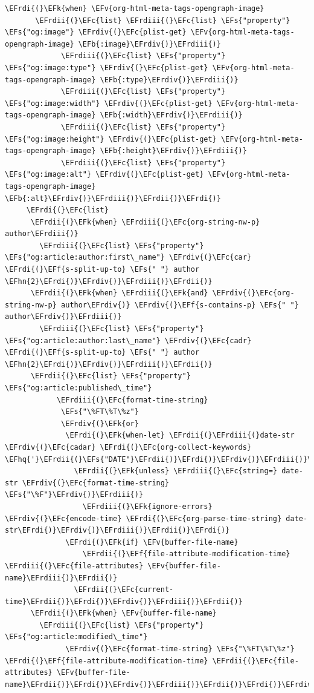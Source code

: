 \documentclass{scrartcl}
\newcommand{\EFk}[1]{\textcolor{EFk}{#1}} %
\newcommand{\EFs}[1]{\textcolor{EFs}{#1}} %
\newcommand{\EFb}[1]{\textcolor{EFb}{#1}} %
\newcommand{\EFc}[1]{\textcolor{EFc}{#1}} %
\newcommand{\EFv}[1]{\textcolor{EFv}{#1}} %
\newcommand{\EFf}[1]{\textcolor{EFf}{#1}} %
\newcommand{\EFhn}[1]{\textcolor{EFhn}{\textbf{#1}}} %
\newcommand{\EFhq}[1]{\textcolor{EFhq}{#1}} %
\newcommand{\EFrdi}[1]{\textcolor{EFrdi}{#1}} %
\newcommand{\EFrdii}[1]{\textcolor{EFrdii}{#1}} %
\newcommand{\EFrdiii}[1]{\textcolor{EFrdiii}{#1}} %
\newcommand{\EFrdiv}[1]{\textcolor{EFrdiv}{#1}} %
\begin{document}
\begin{Code}
\begin{Verbatim}[]
     \EFrdi{(}\EFk{when} \EFv{org-html-meta-tags-opengraph-image}
       \EFrdii{(}\EFc{list} \EFrdiii{(}\EFc{list} \EFs{"property"} \EFs{"og:image"} \EFrdiv{(}\EFc{plist-get} \EFv{org-html-meta-tags-opengraph-image} \EFb{:image}\EFrdiv{)}\EFrdiii{)}
             \EFrdiii{(}\EFc{list} \EFs{"property"} \EFs{"og:image:type"} \EFrdiv{(}\EFc{plist-get} \EFv{org-html-meta-tags-opengraph-image} \EFb{:type}\EFrdiv{)}\EFrdiii{)}
             \EFrdiii{(}\EFc{list} \EFs{"property"} \EFs{"og:image:width"} \EFrdiv{(}\EFc{plist-get} \EFv{org-html-meta-tags-opengraph-image} \EFb{:width}\EFrdiv{)}\EFrdiii{)}
             \EFrdiii{(}\EFc{list} \EFs{"property"} \EFs{"og:image:height"} \EFrdiv{(}\EFc{plist-get} \EFv{org-html-meta-tags-opengraph-image} \EFb{:height}\EFrdiv{)}\EFrdiii{)}
             \EFrdiii{(}\EFc{list} \EFs{"property"} \EFs{"og:image:alt"} \EFrdiv{(}\EFc{plist-get} \EFv{org-html-meta-tags-opengraph-image} \EFb{:alt}\EFrdiv{)}\EFrdiii{)}\EFrdii{)}\EFrdi{)}
     \EFrdi{(}\EFc{list}
      \EFrdii{(}\EFk{when} \EFrdiii{(}\EFc{org-string-nw-p} author\EFrdiii{)}
        \EFrdiii{(}\EFc{list} \EFs{"property"} \EFs{"og:article:author:first\_name"} \EFrdiv{(}\EFc{car} \EFrdi{(}\EFf{s-split-up-to} \EFs{" "} author \EFhn{2}\EFrdi{)}\EFrdiv{)}\EFrdiii{)}\EFrdii{)}
      \EFrdii{(}\EFk{when} \EFrdiii{(}\EFk{and} \EFrdiv{(}\EFc{org-string-nw-p} author\EFrdiv{)} \EFrdiv{(}\EFf{s-contains-p} \EFs{" "} author\EFrdiv{)}\EFrdiii{)}
        \EFrdiii{(}\EFc{list} \EFs{"property"} \EFs{"og:article:author:last\_name"} \EFrdiv{(}\EFc{cadr} \EFrdi{(}\EFf{s-split-up-to} \EFs{" "} author \EFhn{2}\EFrdi{)}\EFrdiv{)}\EFrdiii{)}\EFrdii{)}
      \EFrdii{(}\EFc{list} \EFs{"property"} \EFs{"og:article:published\_time"}
            \EFrdiii{(}\EFc{format-time-string}
             \EFs{"\%FT\%T\%z"}
             \EFrdiv{(}\EFk{or}
              \EFrdi{(}\EFk{when-let} \EFrdii{(}\EFrdiii{(}date-str \EFrdiv{(}\EFc{cadar} \EFrdi{(}\EFc{org-collect-keywords} \EFhq{'}\EFrdii{(}\EFs{"DATE"}\EFrdii{)}\EFrdi{)}\EFrdiv{)}\EFrdiii{)}\EFrdii{)}
                \EFrdii{(}\EFk{unless} \EFrdiii{(}\EFc{string=} date-str \EFrdiv{(}\EFc{format-time-string} \EFs{"\%F"}\EFrdiv{)}\EFrdiii{)}
                  \EFrdiii{(}\EFk{ignore-errors} \EFrdiv{(}\EFc{encode-time} \EFrdi{(}\EFc{org-parse-time-string} date-str\EFrdi{)}\EFrdiv{)}\EFrdiii{)}\EFrdii{)}\EFrdi{)}
              \EFrdi{(}\EFk{if} \EFv{buffer-file-name}
                  \EFrdii{(}\EFf{file-attribute-modification-time} \EFrdiii{(}\EFc{file-attributes} \EFv{buffer-file-name}\EFrdiii{)}\EFrdii{)}
                \EFrdii{(}\EFc{current-time}\EFrdii{)}\EFrdi{)}\EFrdiv{)}\EFrdiii{)}\EFrdii{)}
      \EFrdii{(}\EFk{when} \EFv{buffer-file-name}
        \EFrdiii{(}\EFc{list} \EFs{"property"} \EFs{"og:article:modified\_time"}
              \EFrdiv{(}\EFc{format-time-string} \EFs{"\%FT\%T\%z"} \EFrdi{(}\EFf{file-attribute-modification-time} \EFrdii{(}\EFc{file-attributes} \EFv{buffer-file-name}\EFrdii{)}\EFrdi{)}\EFrdiv{)}\EFrdiii{)}\EFrdii{)}\EFrdi{)}\EFrdiv{)}\EFrdiii{)}\EFrdii{)}


\end{Verbatim}
\end{Code}
\end{document}
